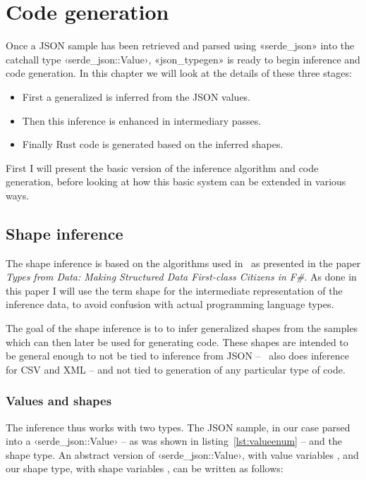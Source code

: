 
\chapter{Code generation}
\label{sec:code-generation}

Once a JSON sample has been retrieved and parsed using «serde_json» into the catchall type ‹serde_json::Value›, «json_typegen» is ready to begin inference and code generation. In this chapter we will look at the details of these three stages:

\begin{itemize}
  \item First a generalized  is inferred from the JSON values.
  \item Then this inference is enhanced in intermediary passes.
  \item Finally Rust code is generated based on the inferred shapes.
\end{itemize}

First I will present the basic version of the inference algorithm and code generation, before looking at how this basic system can be extended in various ways.

\section{Shape inference}
\label{sec:shape-inference}

The shape inference is based on the algorithms used in \fsharpdata\ as presented in the paper \emph{Types from Data: Making Structured Data First-class Citizens in F\#}\cite{fsharp-types-from-data}. As done in this paper I will use the term shape for the intermediate representation of the inference data, to avoid confusion with actual programming language types.

The goal of the shape inference is to to infer generalized shapes from the samples which can then later be used for generating code. These shapes are intended to be general enough to not be tied to inference from JSON -- \fsharpdata\ also does inference for CSV and XML -- and not tied to generation of any particular type of code.

\subsection{Values and shapes}

The inference thus works with two types. The JSON sample, in our case parsed into a ‹serde_json::Value› -- as was shown in listing~\ref{lst:valueenum} -- and the shape type. An abstract version of ‹serde_json::Value›, with value variables \omega, and our shape type, with shape variables \sigma, can be written as follows:

